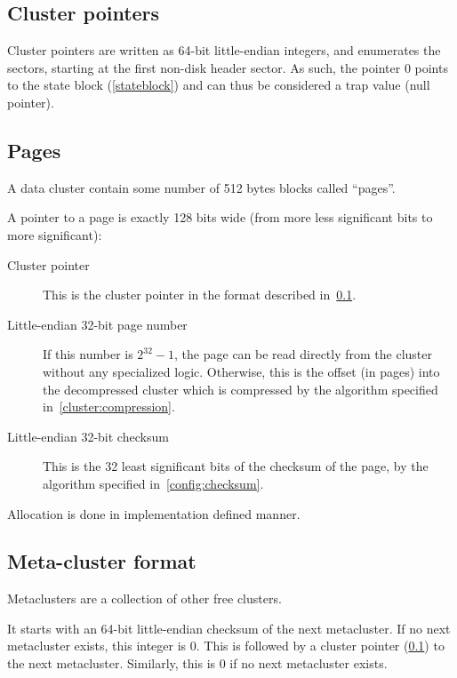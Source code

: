 \documentclass[11pt,a4paper]{report}
\newcommand{\clustersize}{512 }
\begin{document}
        \subsection{Cluster pointers}
        \label{cluster:ptr}
        Cluster pointers are written as 64-bit little-endian integers, and
        enumerates the sectors, starting at the first non-disk header sector.
        As such, the pointer 0 points to the state block (\ref{stateblock}) and
        can thus be considered a trap value (null pointer).

        \subsection{Pages}
        \label{cluster:page}
        A data cluster contain some number of \clustersize bytes blocks called
        ``pages''.

        A pointer to a page is exactly 128 bits wide (from more less
        significant bits to more significant):

        \begin{description}
            \item [Cluster pointer] This is the cluster pointer in the format
                described in~\ref{cluster:ptr}.
            \item [Little-endian 32-bit page number] If this number is $2^{32}
                - 1$, the page can be read directly from the cluster without
                any specialized logic.  Otherwise, this is the offset (in
                pages) into the decompressed cluster which is compressed by the
                algorithm specified in~\ref{cluster:compression}.
            \item [Little-endian 32-bit checksum] This is the 32 least
                significant bits of the checksum of the page, by the algorithm
                specified in~\ref{config:checksum}.
        \end{description}

        Allocation is done in implementation defined manner.

        \subsection{Meta-cluster format}
        \label{cluster:metacluster}
        Metaclusters are a collection of other free clusters.

        It starts with an 64-bit little-endian checksum of the next
        metacluster. If no next metacluster exists, this integer is 0. This is
        followed by a cluster pointer (\ref{cluster:ptr}) to the next
        metacluster. Similarly, this is 0 if no next metacluster exists.
\end{document}
